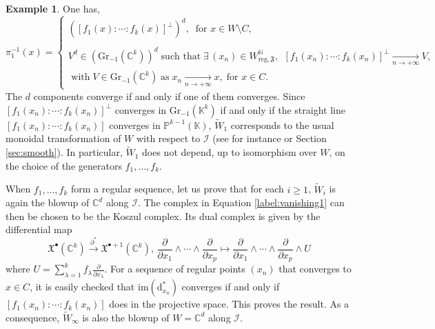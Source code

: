 \documentclass[10pt]{article}
\theoremstyle{plain}
\theoremstyle{definition}
\newtheorem{example}[lemma]{Example}
\theoremstyle{remark}
\newcommand{\dd}{\mathrm{d}}
\begin{document}
\begin{example}
 One has, $$\pi_1^{-1}(x)=\begin{cases} \left([f_1(x):\cdots :f_k(x)]^\perp\right)^d,\;
    \; \text{for $x\in W\setminus C$,}\\\\ V^d\in\left(\mathrm{Gr}_{-1}(\mathbb{C}^k)\right)^d\;\text{such that}\; \exists\, (x_n)\in W_{\mathrm{reg},\mathfrak{F}}^{\mathbb{N}},\,\; [f_1(x_n):\cdots :f_k(x_n)]^\perp\underset{n \to +\infty}{\longrightarrow} V,\\ \text{ with}\; V\in\mathrm{Gr}_{-1}(\mathbb C^k)\; \text{as}\; x_n\underset{n \to +\infty}{\longrightarrow}x, \;\text{for $x\in C$}.\end{cases}$$
The $d$ components converge if and only if one of them converges.
    Since $[f_1(x_n):\cdots :f_k(x_n)]^\perp$ converges in $\mathrm{Gr}_{-1}(\mathbb K^k)$ if and only if the straight line $[f_1(x_n):\cdots :f_k(x_n)]$  converges in $\mathbb P^{k-1}(\mathbb K)$, $\widetilde{W}_1$ corresponds to the usual monoidal transformation of $W$ with respect to $\mathcal{I}$ (see for instance \cite{HauserHerwig} or Section \ref{sec:smooth}). In particular, $\widetilde{W}_1$ does not depend, up to isomorphism over $W$, on the choice of the generators $f_1,\ldots, f_k$.

    When $f_1,\ldots, f_k$ form a regular sequence, let us prove that for each $i\geq 1$, $\widetilde W_i$ is again the blowup of $\mathbb C^d$ along $\mathcal I$. The complex in Equation \eqref{label:vanishing1} can then be chosen to be the Koszul complex. Its dual complex is given by the differential map $$\mathfrak X^\bullet(\mathbb C^k)\stackrel{\partial^*}{\longrightarrow}\mathfrak X^{\bullet+1}(\mathbb C^k),\, \frac{\partial}{\partial x_1}\wedge\cdots\wedge\frac{\partial}{\partial x_p}\longmapsto \frac{\partial}{\partial x_1}\wedge\cdots\wedge\frac{\partial}{\partial x_p}\wedge U $$where $U=\sum_{\lambda=1}^k f_\lambda\frac{\partial}{\partial x_\lambda}$. For a sequence of regular points $(x_n)$ that converges to $x\in C$, it is easily checked that  $\mathrm{im}(\dd^*_{x_n})$ converges if and only if $[f_1(x_n): \cdots :f_k(x_n)]$ does in the projective space. This proves the result. As a consequence, $\widetilde W_\infty$ is also the blowup of $W= \mathbb C^d$ along $\mathcal{I}$.
    \end{example}
\end{document}
